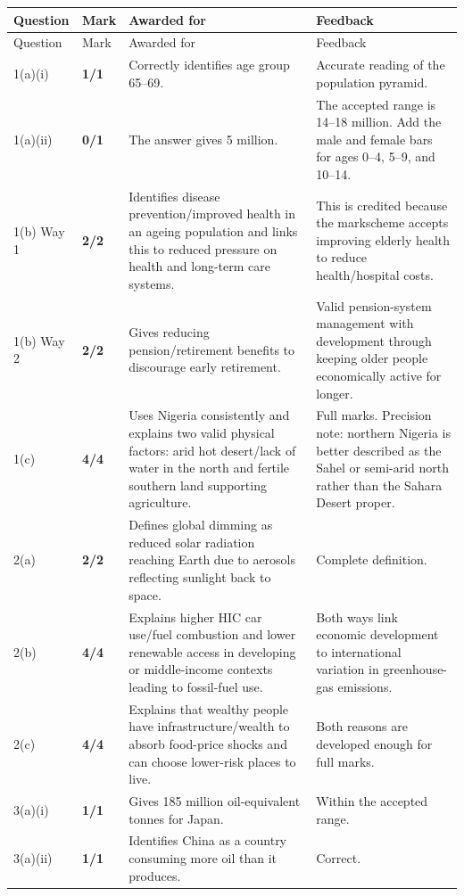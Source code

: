 \documentclass[11pt]{article}
\newcommand{\markcell}[2]{\textbf{#1/#2}}
\begin{document}
\begin{longtable}{@{}p{} p{} p{} p{}@{}}
\toprule
Question & Mark & Awarded for & Feedback \\
\midrule
\endfirsthead
\toprule
Question & Mark & Awarded for & Feedback \\
\midrule
\endhead
1(a)(i) & \markcell{1}{1} & Correctly identifies age group 65--69. & Accurate reading of the population pyramid. \\
1(a)(ii) & \markcell{0}{1} & The answer gives 5 million. & The accepted range is 14--18 million. Add the male and female bars for ages 0--4, 5--9, and 10--14. \\
1(b) Way 1 & \markcell{2}{2} & Identifies disease prevention/improved health in an ageing population and links this to reduced pressure on health and long-term care systems. & This is credited because the markscheme accepts improving elderly health to reduce health/hospital costs. \\
1(b) Way 2 & \markcell{2}{2} & Gives reducing pension/retirement benefits to discourage early retirement. & Valid pension-system management with development through keeping older people economically active for longer. \\
1(c) & \markcell{4}{4} & Uses Nigeria consistently and explains two valid physical factors: arid hot desert/lack of water in the north and fertile southern land supporting agriculture. & Full marks. Precision note: northern Nigeria is better described as the Sahel or semi-arid north rather than the Sahara Desert proper. \\
\midrule
2(a) & \markcell{2}{2} & Defines global dimming as reduced solar radiation reaching Earth due to aerosols reflecting sunlight back to space. & Complete definition. \\
2(b) & \markcell{4}{4} & Explains higher HIC car use/fuel combustion and lower renewable access in developing or middle-income contexts leading to fossil-fuel use. & Both ways link economic development to international variation in greenhouse-gas emissions. \\
2(c) & \markcell{4}{4} & Explains that wealthy people have infrastructure/wealth to absorb food-price shocks and can choose lower-risk places to live. & Both reasons are developed enough for full marks. \\
\midrule
3(a)(i) & \markcell{1}{1} & Gives 185 million oil-equivalent tonnes for Japan. & Within the accepted range. \\
3(a)(ii) & \markcell{1}{1} & Identifies China as a country consuming more oil than it produces. & Correct. \\

\end{longtable}
\end{document}
